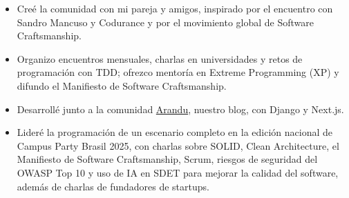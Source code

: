 \documentclass[10pt,a4paper]{altacv}
\begin{document}
\begin{itemize}
\setlength{\itemindent}{0.5em}
\item[--] Creé la comunidad con mi pareja y amigos, inspirado por el encuentro con Sandro Mancuso y Codurance y por el movimiento global de Software Craftsmanship.
\item[--] Organizo encuentros mensuales, charlas en universidades y retos de programación con TDD; ofrezco mentoría en Extreme Programming (XP) y difundo el Manifiesto de Software Craftsmanship.
\item[--] Desarrollé junto a la comunidad \href{https://dwcorp.com.br/arandu}{Arandu}, nuestro blog, con Django y Next.js.
\item[--] Lideré la programación de un escenario completo en la edición nacional de Campus Party Brasil 2025, con charlas sobre SOLID, Clean Architecture, el Manifiesto de Software Craftsmanship, Scrum, riesgos de seguridad del OWASP Top 10 y uso de IA en SDET para mejorar la calidad del software, además de charlas de fundadores de startups.
\end{itemize}

\newpage
{}

\end{document}
